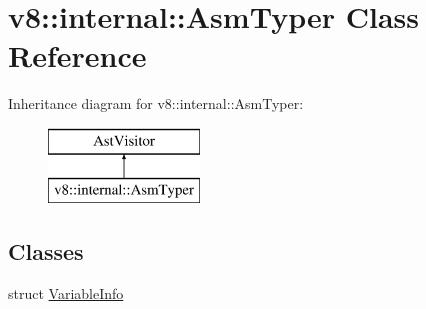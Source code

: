 \hypertarget{classv8_1_1internal_1_1_asm_typer}{}\section{v8\+:\+:internal\+:\+:Asm\+Typer Class Reference}
\label{classv8_1_1internal_1_1_asm_typer}
Inheritance diagram for v8\+:\+:internal\+:\+:Asm\+Typer\+:\begin{figure}[H]
\begin{center}
\leavevmode
\includegraphics[height=2.000000cm]{classv8_1_1internal_1_1_asm_typer}
\end{center}
\end{figure}
\subsection*{Classes}
\begin{DoxyCompactItemize}
\item 
struct \hyperlink{structv8_1_1internal_1_1_asm_typer_1_1_variable_info}{Variable\+Info}
\end{DoxyCompactItemize}
